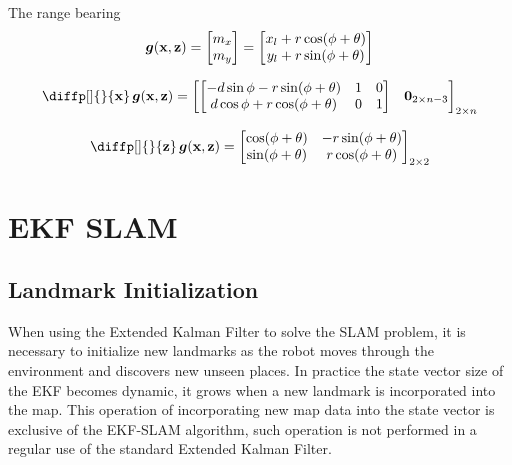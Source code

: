 \documentclass[12pt]{article}
\begin{document}
The range bearing 
\begin{equation}
    {\boldsymbol{g}}(\boldsymbol{\mathbf{x}}, \boldsymbol{\mathbf{z}}) = 
    \begin{bmatrix}
        m_x \\
        m_y \\
    \end{bmatrix} =
    \begin{bmatrix}
        x_l + r \cos(\phi + \theta)\\
        y_l + r \sin(\phi + \theta) 
    \end{bmatrix}
    \label{eq:measurement-inverse-model}
\end{equation}

\begin{equation}
    \diffp[]{}{\bvec{x}} \, \mb{g}(\bvec{x}, \bvec{z}) = 
    \begin{bmatrix}\begin{bmatrix}
        -d \sin{\phi} - r \sin(\phi + \theta)  & 1 & 0\\
        d\cos{\phi} + r\cos(\phi + \theta) & 0 & 1
    \end{bmatrix} & \matnull{2}{n-3} \end{bmatrix}_{2 \times n}
\end{equation}

\begin{equation}
    \diffp[]{}{\bvec{z}} \, \mb{g}(\bvec{x}, \bvec{z}) = \begin{bmatrix}
       \cos(\phi + \theta) & -r\sin(\phi + \theta)\\
       \sin(\phi + \theta) & r\cos(\phi + \theta)
    \end{bmatrix}_{2 \times 2}
\end{equation}

\section{EKF SLAM}

\subsection{Landmark Initialization}
When using the Extended Kalman Filter to solve the SLAM problem, it is necessary 
to initialize new landmarks as the robot moves through the environment and 
discovers new unseen places. In practice the state vector size of the 
EKF becomes dynamic, it grows when a new landmark is incorporated into 
the map. This operation of incorporating new map data into the state vector is
exclusive of the EKF-SLAM algorithm, such operation is not performed in a 
regular use of the standard Extended Kalman Filter.
\end{document}
